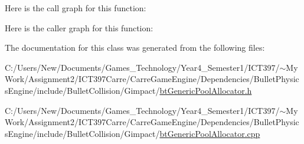 Here is the call graph for this function:

Here is the caller graph for this function:

The documentation for this class was generated from the following files:\begin{CompactItemize}
\item 
C:/Users/New/Documents/Games\_\-Technology/Year4\_\-Semester1/ICT397/$\sim$My Work/Assignment2/ICT397Carre/CarreGameEngine/Dependencies/BulletPhysicsEngine/include/BulletCollision/Gimpact/\hyperlink{bt_generic_pool_allocator_8h}{btGenericPoolAllocator.h}\item 
C:/Users/New/Documents/Games\_\-Technology/Year4\_\-Semester1/ICT397/$\sim$My Work/Assignment2/ICT397Carre/CarreGameEngine/Dependencies/BulletPhysicsEngine/include/BulletCollision/Gimpact/\hyperlink{bt_generic_pool_allocator_8cpp}{btGenericPoolAllocator.cpp}\end{CompactItemize}
